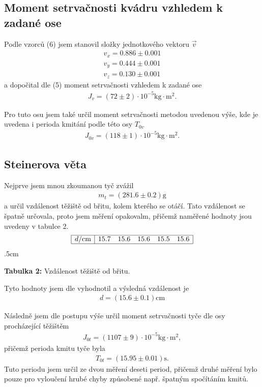 \documentclass[a4paper,12pt]{article}
\begin{document}
\subsection{Moment setrvačnosti kvádru vzhledem k zadané ose}
\noindent
Podle vzorců (6) jsem stanovil složky jednotkového vektoru $\vec v$
\begin{eqnarray}
	v_x=0.886\pm0.001\\
	v_y=0.444\pm0.001\\
	v_z=0.130\pm0.001
\end{eqnarray}
a dopočital dle (5) moment setrvačnosti vzhledem k zadané ose
\begin{eqnarray}
	J_{v}=(72\pm2)\cdot 10^{-5} \mbox{kg}\cdot\mbox{m}^2.
\end{eqnarray}

Pro tuto osu jsem také určil moment setrvačnosti metodou uvedenou výše, kde je uvedena 
i perioda kmitání podle této osy $T_{0v}$
\begin{eqnarray}
	J_{0v}=(118\pm1)\cdot 10^{-5} \mbox{kg}\cdot\mbox{m}^2.
\end{eqnarray}

\subsection{Steinerova věta}
\noindent
Nejprve jsem mnou zkoumanou tyč zvážil
\begin{eqnarray}
	m_t=(281.6\pm0.2)\mbox{g}
\end{eqnarray}
a určil vzdálenost těžiště od břitu, kolem kterého se otáčí. Tato vzdálenost se špatně 
určovala, proto jsem měření opakovalm, přičemž naměřené hodnoty jsou uvedeny v tabulce 2.
$$
\begin{array}{|c|ccccc|}
\hline
d/\mbox{cm}&	15.7&	15.6&	15.6&	15.5&	15.6 \\
\hline
\end{array}
$$
\vglue.5cm
\begin{center}
	\textbf{Tabulka 2:} Vzdálenost těžiště od břitu.
\end{center}
Tyto hodnoty jsem dle \cite{chyba} vyhodnotil a výsledná vzdálenost je
\begin{eqnarray}
	d=(15.6\pm0.1)\mbox{cm}
\end{eqnarray}

Následně jsem dle postupu výše určil moment setrvačnosti tyče dle osy procházející těžištěm
\begin{eqnarray}
	J_{0t}=(1107\pm9)\cdot 10^{-5} \mbox{kg}\cdot\mbox{m}^2,
\end{eqnarray}
přičemž perioda kmitu tyče byla
\begin{eqnarray}
	T_{0t}=(15.95\pm0.01)\mbox{s}.
\end{eqnarray}
Tuto periodu jsem určil ze dvou měření deseti period, přičemž druhé měření bylo pouze pro 
vyloučení hrubé chyby způsobené např. špatným spočítáním kmitů.
\end{document}
